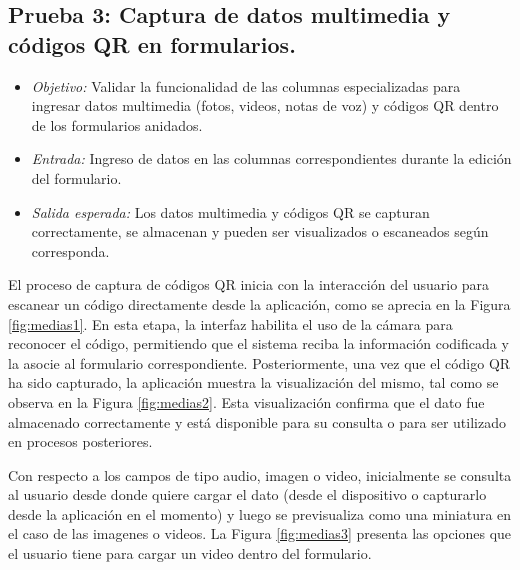 \documentclass{article}
\begin{document}
\subsection{Prueba 3: Captura de datos multimedia y códigos QR en formularios.}
\begin{itemize}
  \item \textit{Objetivo:} Validar la funcionalidad de las columnas especializadas para ingresar datos multimedia (fotos, videos, notas de voz) y códigos QR dentro de los formularios anidados.
  \item \textit{Entrada:} Ingreso de datos en las columnas correspondientes durante la edición del formulario.
  \item \textit{Salida esperada:} Los datos multimedia y códigos QR se capturan correctamente, se almacenan y pueden ser visualizados o escaneados según corresponda.
\end{itemize}

El proceso de captura de códigos QR inicia con la interacción del usuario para escanear un código directamente desde la aplicación, como se aprecia en la Figura \ref{fig:medias1}. En esta etapa, la interfaz habilita el uso de la cámara para reconocer el código, permitiendo que el sistema reciba la información codificada y la asocie al formulario correspondiente. Posteriormente, una vez que el código QR ha sido capturado, la aplicación muestra la visualización del mismo, tal como se observa en la Figura \ref{fig:medias2}. Esta visualización confirma que el dato fue almacenado correctamente y está disponible para su consulta o para ser utilizado en procesos posteriores.

Con respecto a los campos de tipo audio, imagen o video, inicialmente se consulta al usuario desde donde quiere cargar el dato (desde el dispositivo o capturarlo desde la aplicación en el momento) y luego se previsualiza como una miniatura en el caso de las imagenes o videos. La Figura \ref{fig:medias3} presenta las opciones que el usuario tiene para cargar un video dentro del formulario.
\end{document}
